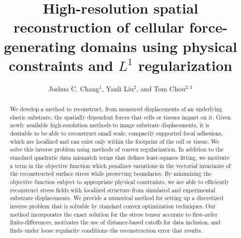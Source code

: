 \documentclass[aps,prl,reprint,twocolumn,groupedaddress,showpacs]{revtex4}
\begin{document}
\title{High-resolution spatial reconstruction of cellular
  force-generating domains using physical constraints and $L^{1}$
  regularization}

\author{Joshua C. Chang$^{1}$, Yanli Liu$^{2}$, and Tom Chou$^{2,3}$}
 





\begin{abstract}
We develop a method to reconstruct, from measured displacements of an
underlying elastic substrate, the spatially dependent forces that
cells or tissues impart on it.  Given newly available high-resolution
methods to image substrate displacements, it is desirable to be able
to reconstruct small scale, compactly supported focal adhesions, which
are localized and can exist only within the footprint of the cell or
tissue.  We solve this inverse problem using methods of convex
regularization. In addition to the standard quadratic data mismatch
terms that defines least-squares fitting, we motivate a term in the
objective function which penalizes variations in the vectorial invariants
of the reconstructed surface stress while preserving boundaries.  By
minimizing the objective function subject to appropriate physical
constraints, we are able to efficiently reconstruct stress fields with
localized structure from simulated and experimental substrate
displacements. We provide a numerical method for setting up a
discretized inverse problem that is solvable by standard convex
optimization techniques. Our method incorporates the exact solution
for the stress tensor accurate to first-order finite-differences,
motivates the use of distance-based cutoffs for data inclusion, and
finds--under loose regularity conditions--the reconstruction error
that results.
\end{abstract}
\maketitle
\end{document}
